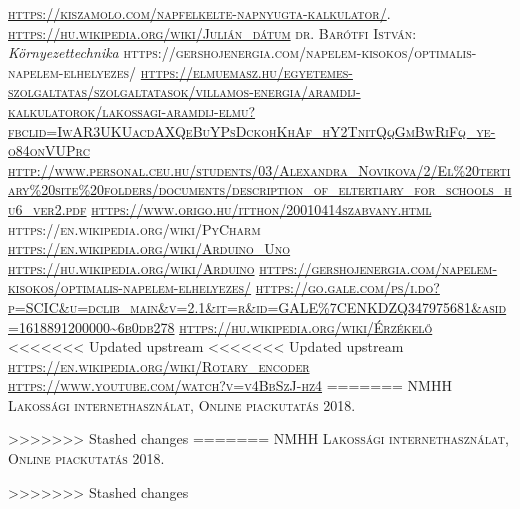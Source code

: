 \documentclass[
]{thesis-ekf}
\theoremstyle{definition}
\theoremstyle{remark}
\begin{document}
\begin{thebibliography}{2}
\textsc{\url{https://kiszamolo.com/napfelkelte-napnyugta-kalkulator/}}.
\textsc{\url{https://hu.wikipedia.org/wiki/Julián_dátum}}
\textsc{dr. Barótfi István}:  \emph{Környezettechnika}
\textsc{https://gershojenergia.com/napelem-kisokos/optimalis-napelem-elhelyezes/}
\textsc{\url{https://elmuemasz.hu/egyetemes-szolgaltatas/szolgaltatasok/villamos-energia/aramdij-kalkulatorok/lakossagi-aramdij-elmu?fbclid=IwAR3UKUacdAXQeBuYPsDckohKhAf_hY2TnitQqGmBwRiFq_ye-o84onVUPrc}}
\textsc{\url{http://www.personal.ceu.hu/students/03/Alexandra_Novikova/2/El\%20tertiary\%20site\%20folders/documents/description_of_eltertiary_for_schools_hu6_ver2.pdf}}
\textsc{\url{https://www.origo.hu/itthon/20010414szabvany.html}}
\textsc{https://en.wikipedia.org/wiki/PyCharm}
\textsc{\url{https://en.wikipedia.org/wiki/Arduino_Uno}}
\textsc{\url{https://hu.wikipedia.org/wiki/Arduino}}
\textsc{\url{https://gershojenergia.com/napelem-kisokos/optimalis-napelem-elhelyezes/}}
\textsc{\url{https://go.gale.com/ps/i.do?p=SCIC&u=dclib_main&v=2.1&it=r&id=GALE\%7CENKDZQ347975681&asid=1618891200000~6b0db278}}
\textsc{\url{https://hu.wikipedia.org/wiki/Érzékelő}}
<<<<<<< Updated upstream
<<<<<<< Updated upstream
\textsc{\url{https://en.wikipedia.org/wiki/Rotary_encoder}}
\textsc{\url{https://www.youtube.com/watch?v=v4BbSzJ-hz4}}
=======
\textsc{NMHH Lakossági internethasználat, Online piackutatás 2018.}

>>>>>>> Stashed changes
=======
\textsc{NMHH Lakossági internethasználat, Online piackutatás 2018.}

>>>>>>> Stashed changes
\end{thebibliography}
\end{document}
